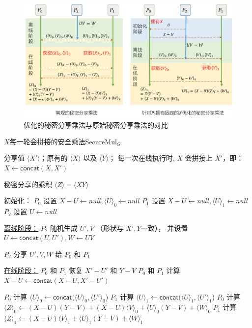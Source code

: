 \begin{figure}[h!]
    \centering
    \includegraphics[width=\linewidth]{Z_Resources/perm-llm_ssmul.png}    
    \caption{优化的秘密分享乘法与原始秘密分享乘法的对比}
    \label{fig:perm-llm:ssmul}
\end{figure}
\begin{algorithm}[h]
    \caption{$X$每一轮会拼接的安全乘法\textsf{SecureMul}$_G$}
    \label{alg:perm-llm:secure_mul_growing}
    \begin{algorithmic}[1]
    \Require 分享值 $\langle X' \rangle$；原有的 $\langle X \rangle$ 以及 $\langle Y \rangle$；
    每一次在线执行时, $X$ 会拼接上 $X'$，即：$X \gets \mathsf{concat}(X, X')$
    
    \Ensure 秘密分享的乘积 $\langle Z \rangle =\langle XY \rangle$
    
    \item[\underline{初始化：}]
    \State 
        $P_0$ 设置 $X - U \gets null, \langle U \rangle_0 \gets null$
        $P_1$ 设置 $X - U \gets null, \langle U \rangle_1 \gets null$
    \State $P_2$ 设置 $U \gets null$
    
    
    \item[\underline{离线阶段：}]
    \State $P_2$ 随机生成 $U', V$ （形状与 $X', Y$一致）， 并设置 $U\gets \mathsf{concat}(U, U'), W \gets UV$
    
    \State $P_2$ 分享 $U', V, W$ 给 $P_0$ 和 $P_1$
    
    \item[\underline{在线阶段：}]
    \State $P_0$ 和 $P_1$ 恢复 $X' - U'$ 和 $Y - V$
    \State $P_0$ 和 $P_1$ 计算 $X - U \gets \mathsf{concat}(X - U, X'-U')$
    
    \State 
        $P_0$ 计算 $\langle U \rangle_0 \gets \mathsf{concat}(\langle U \rangle_0, \langle U' \rangle_0$)
        $P_1$ 计算 $\langle U \rangle_1 \gets \mathsf{concat}(\langle U \rangle_1, \langle U' \rangle_1$)
    \State $P_0$ 计算 $\langle Z \rangle_0 \gets (X-U)(Y-V) + (X-U)\langle V \rangle_0 + \langle U\rangle_0(Y-V) + \langle W \rangle_0$
    \State $P_1$ 计算 $\langle Z \rangle_1 \gets (X-U) \langle V \rangle_1 + \langle U\rangle_1(Y-V) + \langle W \rangle_1$
    \end{algorithmic}
    \end{algorithm}

